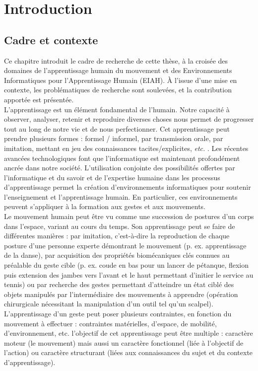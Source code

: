 \part{Introduction}
\chapter{Cadre et contexte}  %
Ce chapitre introduit le cadre de recherche de cette thèse, à la croisée des domaines de l'apprentissage humain du mouvement et des Environnements Informatiques pour l'Apprentissage Humain (EIAH). À l'issue d'une mise en contexte, les problématiques de recherche sont soulevées, et la contribution apportée est présentée.\\

L'apprentissage est un élément fondamental de l'humain. Notre capacité à observer, analyser, retenir et reproduire diverses choses nous permet de progresser tout au long de notre vie et de nous perfectionner. Cet apprentissage peut prendre plusieurs formes : formel / informel, par transmission orale, par imitation, mettant en jeu des connaissances tacites/explicites, \textit{etc.} \parencite{Eraut200Nfl}. Les récentes avancées technologiques font que l'informatique est maintenant profondément ancrée dans notre société. L'utilisation conjointe des possibilités offertes par l'informatique et du savoir et de l'expertise humaine dans les processus d'apprentissage permet la création d'environnements informatiques pour soutenir l'enseignement et l'apprentissage humain. En particulier, ces environnements peuvent s'appliquer à la formation aux gestes et aux mouvements.\\

Le mouvement humain peut être vu comme une succession de postures d'un corps dans l'espace, variant au cours du temps. Son apprentissage peut se faire de différentes manières : par imitation, c'est-à-dire la reproduction de chaque posture d'une personne experte démontrant le mouvement (p. ex. apprentissage de la danse), par acquisition des propriétés biomécaniques clés connues au préalable du geste cible (p. ex. coude en bas pour un lancer de pétanque, flexion puis extension des jambes vers l'avant et le haut permettant d'initier le service au tennis) ou par recherche des gestes permettant d'atteindre un état ciblé des objets manipulés par l'intermédiaire des mouvements à apprendre (opération chirurgicale nécessitant la manipulation d'un outil tel qu'un scalpel). L'apprentissage d'un geste peut poser plusieurs contraintes, en fonction du mouvement à effectuer : contraintes matérielles, d'espace, de mobilité, d'environnement, etc. l'objectif de cet apprentissage peut être multiple : caractère moteur (le mouvement) mais aussi un caractère fonctionnel (liée à l'objectif de l'action) ou caractère structurant (liées aux connaissances du sujet et du contexte d'apprentissage).

